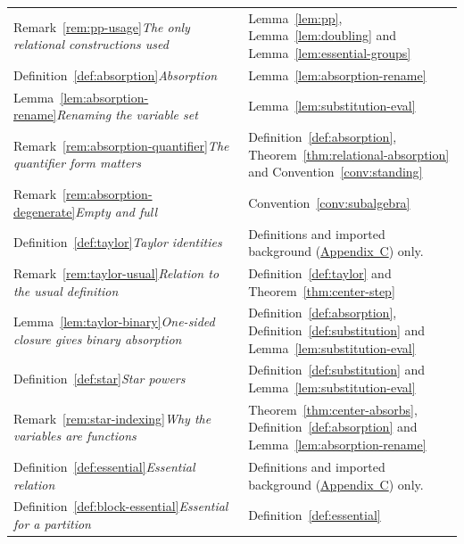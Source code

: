 \documentclass[11pt]{article}
\theoremstyle{mainplain}
\theoremstyle{mainroman}
\theoremstyle{definition}
\numberwithin{equation}{section}
\begin{document}
\begin{longtable}{@{}>{\raggedright\arraybackslash}p{}>{\raggedright\arraybackslash}p{}@{}}
Remark~\ref{rem:pp-usage}\newline\emph{The only relational constructions used} & Lemma~\ref{lem:pp}, Lemma~\ref{lem:doubling} and Lemma~\ref{lem:essential-groups} \\
Definition~\ref{def:absorption}\newline\emph{Absorption} & Lemma~\ref{lem:absorption-rename} \\
Lemma~\ref{lem:absorption-rename}\newline\emph{Renaming the variable set} & Lemma~\ref{lem:substitution-eval} \\
Remark~\ref{rem:absorption-quantifier}\newline\emph{The quantifier form matters} & Definition~\ref{def:absorption}, Theorem~\ref{thm:relational-absorption} and Convention~\ref{conv:standing} \\
Remark~\ref{rem:absorption-degenerate}\newline\emph{Empty and full} & Convention~\ref{conv:subalgebra} \\
Definition~\ref{def:taylor}\newline\emph{Taylor identities} & Definitions and imported background (\hyperref[app:background]{Appendix~C}) only. \\
Remark~\ref{rem:taylor-usual}\newline\emph{Relation to the usual definition} & Definition~\ref{def:taylor} and Theorem~\ref{thm:center-step} \\
Lemma~\ref{lem:taylor-binary}\newline\emph{One-sided closure gives binary absorption} & Definition~\ref{def:absorption}, Definition~\ref{def:substitution} and Lemma~\ref{lem:substitution-eval} \\
Definition~\ref{def:star}\newline\emph{Star powers} & Definition~\ref{def:substitution} and Lemma~\ref{lem:substitution-eval} \\
Remark~\ref{rem:star-indexing}\newline\emph{Why the variables are functions} & Theorem~\ref{thm:center-absorbs}, Definition~\ref{def:absorption} and Lemma~\ref{lem:absorption-rename} \\
Definition~\ref{def:essential}\newline\emph{Essential relation} & Definitions and imported background (\hyperref[app:background]{Appendix~C}) only. \\
Definition~\ref{def:block-essential}\newline\emph{Essential for a partition} & Definition~\ref{def:essential} \\

\end{longtable}
\end{document}
